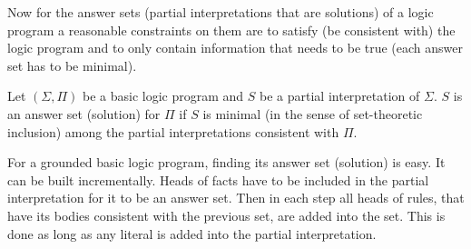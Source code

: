 Now for the answer sets (partial interpretations that are solutions)
of a logic program a reasonable constraints
on them are to satisfy (be consistent with) the logic program and to only contain
information that needs to be true (each answer set has to be minimal).

%
%
\begin{definition}\label{def:as_basic}
    Let $(\Sigma, \Pi)$ be a basic logic program and $S$ be a partial interpretation
    of $\Sigma$. $S$ is an answer set (solution) for $\Pi$ if $S$ is minimal
    (in the sense of set-theoretic inclusion) among the partial interpretations
    consistent with $\Pi$.
\end{definition}

For a grounded basic logic program, finding its answer set (solution)
is easy. It can be built incrementally.
Heads of facts have to be included in the partial interpretation for it to be
an answer set. Then in each step all heads of rules, that have its
bodies consistent with the previous set, are added into the set.
This is done as long as any literal is added into the partial interpretation.

